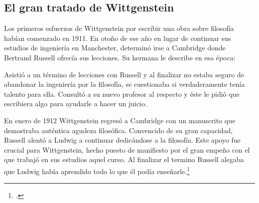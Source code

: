     \subsection{El gran tratado de Wittgenstein}

    Los primeros esfuerzos de Wittgenstein por escribir una obra sobre filosofía
    habían comenzado en 1911. En otoño de ese año en lugar de continuar sus estudios
    de ingeniería en Manchester, determinó irse a Cambridge donde Bertrand Russell
    ofrecía sus lecciones. Su hermana le describe en esa época:   

    Asistió a un término de lecciones con Russell y al finalizar no estaba seguro de
    abandonar la ingeniería por la filosofía, se cuestionaba si verdaderamente tenía
    talento para ella. Consultó a su nuevo profesor al respecto y éste le pidió que
    escribiera algo para ayudarle a hacer un juicio. 

    En enero de 1912 Wittgenstein regresó a Cambridge con un manuscrito que
    demostraba auténtica agudeza filosófica. Convencido de su gran capacidad,
    Russell alentó a Ludwig a continuar dedicándose a la filosofía. Este
    apoyo fue crucial para Wittgenstein, hecho puesto de manifiesto por el gran
    empeño con el que trabajó en sus estudios aquel curso. Al finalizar el termino
    Russell alegaba que Ludwig había aprendido todo lo que él podía
    enseñarle.\footcite[cap. 3 loc 865]{monk} 

